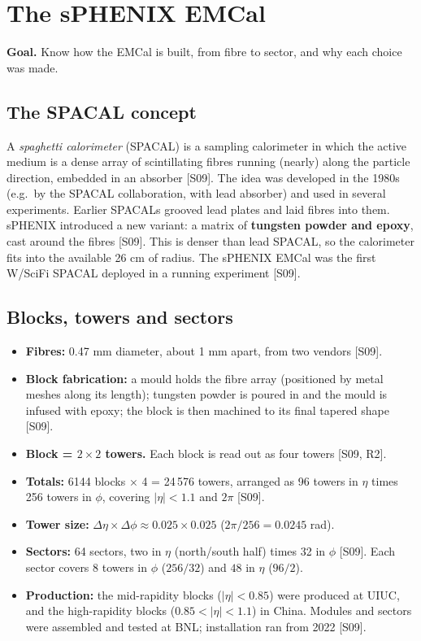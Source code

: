 \documentclass[11pt,letterpaper]{article}
\newcommand{\goal}[1]{\par\noindent\textbf{Goal.} #1\par\smallskip}
\begin{document}
\section{The sPHENIX EMCal}\label{sec:emcal}
\goal{Know how the EMCal is built, from fibre to sector, and why each choice was made.}

\subsection{The SPACAL concept}
A \emph{spaghetti calorimeter} (SPACAL) is a sampling calorimeter in which the active medium is a dense array of scintillating fibres running (nearly) along the particle direction, embedded in an absorber [S09].
The idea was developed in the 1980s (e.g.\ by the SPACAL collaboration, with lead absorber) and used in several experiments.
Earlier SPACALs grooved lead plates and laid fibres into them.
sPHENIX introduced a new variant: a matrix of \textbf{tungsten powder and epoxy}, cast around the fibres [S09].
This is denser than lead SPACAL, so the calorimeter fits into the available 26 cm of radius.
The sPHENIX EMCal was the first W/SciFi SPACAL deployed in a running experiment [S09].

\subsection{Blocks, towers and sectors}
\begin{itemize}
\item \textbf{Fibres:} 0.47 mm diameter, about 1 mm apart, from two vendors [S09].
\item \textbf{Block fabrication:} a mould holds the fibre array (positioned by metal meshes along its length); tungsten powder is poured in and the mould is infused with epoxy; the block is then machined to its final tapered shape [S09].
\item \textbf{Block = $2\times2$ towers.} Each block is read out as four towers [S09, R2].
\item \textbf{Totals:} 6144 blocks $\times$ 4 = 24\,576 towers, arranged as 96 towers in $\eta$ times 256 towers in $\phi$, covering $|\eta|<1.1$ and $2\pi$ [S09].
\item \textbf{Tower size:} $\Delta\eta\times\Delta\phi\approx0.025\times0.025$ ($2\pi/256=0.0245$ rad).
\item \textbf{Sectors:} 64 sectors, two in $\eta$ (north/south half) times 32 in $\phi$ [S09]. Each sector covers $8$ towers in $\phi$ ($256/32$) and $48$ in $\eta$ ($96/2$).
\item \textbf{Production:} the mid-rapidity blocks ($|\eta|<0.85$) were produced at UIUC, and the high-rapidity blocks ($0.85<|\eta|<1.1$) in China. Modules and sectors were assembled and tested at BNL; installation ran from 2022 [S09].
\end{itemize}
\end{document}
